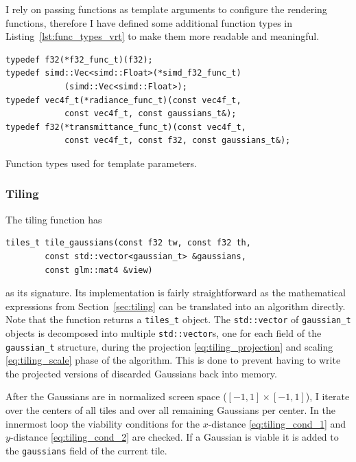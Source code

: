 \documentclass[a4paper, 11pt]{memoir}
\begin{document}
    I rely on passing functions as template arguments to configure the rendering functions, therefore I have defined some
    additional function types in Listing~\ref{lst:func_types_vrt} to make them more readable and meaningful.

    \begin{listing}[t]
        \begin{verbatim}
typedef f32(*f32_func_t)(f32);
typedef simd::Vec<simd::Float>(*simd_f32_func_t)
            (simd::Vec<simd::Float>);
typedef vec4f_t(*radiance_func_t)(const vec4f_t,
            const vec4f_t, const gaussians_t&);
typedef f32(*transmittance_func_t)(const vec4f_t,
            const vec4f_t, const f32, const gaussians_t&);
        \end{verbatim}
        \caption{Function types used for template parameters.}
        \label{lst:func_types_vrt}
    \end{listing}

    \subsubsection{Tiling}
    The tiling function has
    \begin{verbatim}
tiles_t tile_gaussians(const f32 tw, const f32 th,
        const std::vector<gaussian_t> &gaussians,
        const glm::mat4 &view)
    \end{verbatim}
    as its signature. Its implementation is fairly straightforward as the mathematical expressions from Section~\ref{sec:tiling}
    can be translated into an algorithm directly. Note that the function returns a \texttt{tiles_t} object. The
    \texttt{std::vector} of \texttt{gaussian_t} objects is decomposed into
    multiple \texttt{std::vector}s, one for each field of the \texttt{gaussian_t} structure, during
    the projection \eqref{eq:tiling_projection} and scaling \eqref{eq:tiling_scale} phase of the algorithm. This is done
    to prevent having to write the projected versions of discarded Gaussians back into memory.

    After the Gaussians are in normalized screen space ($[-1, 1] \times [-1, 1]$), I iterate over the centers of all
    tiles and over all remaining Gaussians per center. In the innermost loop the viability conditions for the $x$-distance
    \eqref{eq:tiling_cond_1} and $y$-distance \eqref{eq:tiling_cond_2} are checked. If a Gaussian is viable it is
    added to the \texttt{gaussians} field of the current tile.
\end{document}
